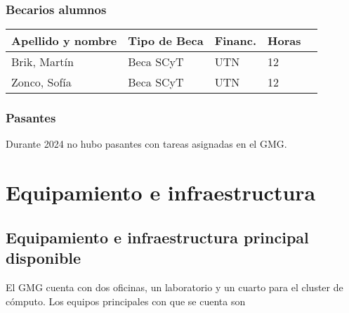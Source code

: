 \documentclass[a4paper,11pt,twoside,final,titlepage,onecolumn,openright]{report}
\begin{document}
\subsubsection{Becarios alumnos}

\begin{tabular}{l l l l r}
\toprule
Apellido y nombre & Tipo de Beca & Financ. & Horas \\
\midrule
Brik, Martín & Beca SCyT & UTN & 12 \\
Zonco, Sofía & Beca SCyT & UTN & 12 \\
\bottomrule 
\end{tabular}

 \subsubsection{Pasantes}

 Durante 2024 no hubo pasantes con tareas asignadas en el GMG.

\normalsize
\vspace{0.5cm}


\section{Equipamiento e infraestructura}

\subsection{Equipamiento e infraestructura principal disponible}

El GMG cuenta con dos oficinas, un laboratorio y un cuarto para el cluster de cómputo. Los equipos principales con que se cuenta son
\end{document}
